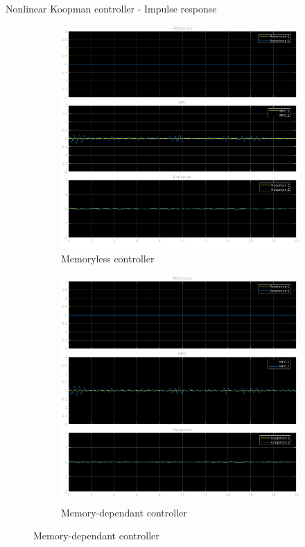 \documentclass{beamer}
\begin{document}
\begin{frame}{Nonlinear Koopman controller - Impulse response}
    \begin{figure}
        \centering
        \begin{subfigure}[b]{0.45\textwidth}
            \centering
            \includegraphics[width=\textwidth]{Undelayed_Koopman_Pulse.png}
            \caption{Memoryless controller}
        \end{subfigure}
        \hfill
        \begin{subfigure}[b]{0.45\textwidth}
            \centering
            \includegraphics[width=\textwidth]{Delayed_Koopman_Pulse.png}
            \caption{Memory-dependant controller}
        \end{subfigure}
    \end{figure}
\end{frame}
\end{document}
